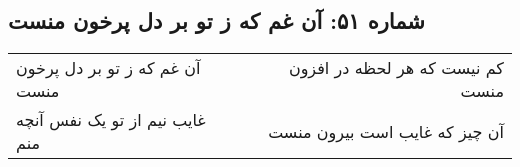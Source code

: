 \begin{center}
\section*{شماره ۵۱: آن غم که ز تو بر دل پرخون منست}
\label{sec:051}
\begin{longtable}{l p{0.5cm} r}
آن غم که ز تو بر دل پرخون منست
&&
کم نیست که هر لحظه در افزون منست
\\
غایب نیم از تو یک نفس آنچه منم
&&
آن چیز که غایب است بیرون منست
\\
\end{longtable}
\end{center}
